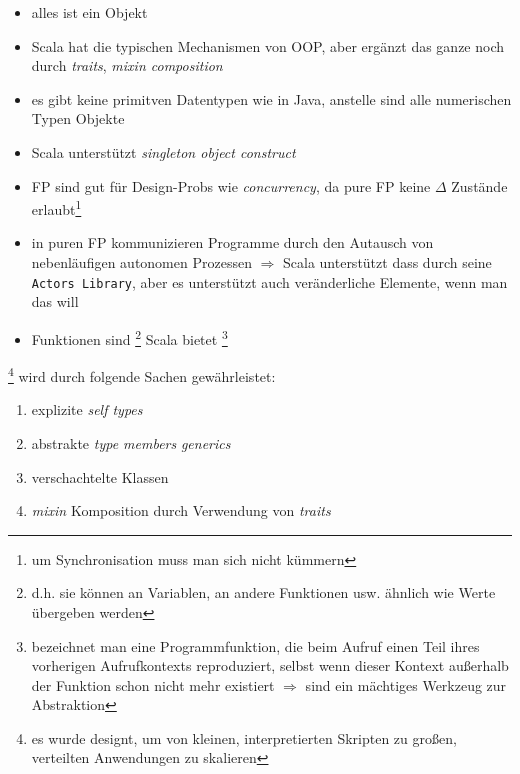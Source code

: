 \begin{itemize}
  \item alles ist ein Objekt
  \item Scala hat die typischen Mechanismen von OOP, aber ergänzt das ganze
  noch durch \textit{traits}, \textit{mixin composition}
  \item es gibt keine primitven Datentypen wie in Java, anstelle sind alle 
  numerischen Typen Objekte
  \item Scala unterstützt \textit{singleton object construct}
\end{itemize}




\begin{itemize}
  \item FP sind gut für Design-Probs wie \textit{concurrency}, da pure FP
  keine $\Delta$ Zustände erlaubt\footnote{um Synchronisation muss man
  sich nicht kümmern}
  \item in puren FP kommunizieren Programme durch den Autausch von
  nebenläufigen autonomen Prozessen $\Rightarrow$ Scala unterstützt dass
  durch seine \texttt{Actors Library}, aber es unterstützt auch
  veränderliche Elemente, wenn man das will
  \item Funktionen sind \footnote{d.h. sie können 
  an Variablen, an andere Funktionen usw. ähnlich wie Werte übergeben werden}
  \und Scala bietet \footnote{bezeichnet man 
  eine Programmfunktion, die beim Aufruf einen Teil ihres vorherigen
  Aufrufkontexts reproduziert, selbst wenn dieser Kontext außerhalb der 
  Funktion schon nicht mehr existiert $\Rightarrow$ sind ein mächtiges 
  Werkzeug zur Abstraktion} 
\end{itemize}


\footnote{es wurde designt, um von kleinen, interpretierten
Skripten zu großen, verteilten Anwendungen zu skalieren} wird durch folgende
Sachen gewährleistet:


\begin{enumerate}
  \item explizite \textit{self types}
  \item abstrakte \textit{type members} \und \textit{generics}
  \item verschachtelte Klassen
  \item \textit{mixin} Komposition durch Verwendung von \textit{traits}
\end{enumerate}


